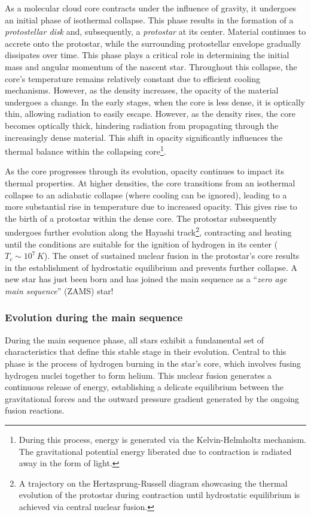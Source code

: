 \documentclass[main.tex]{subfiles}
\begin{document}
    As a molecular cloud core contracts under the influence of gravity, it undergoes an initial phase of isothermal collapse. This phase results in the formation of a \textit{protostellar disk} and, subsequently, a \textit{protostar} at its center. Material continues to accrete onto the protostar, while the surrounding protostellar envelope gradually dissipates over time. This phase plays a critical role in determining the initial mass and angular momentum of the nascent star.
    Throughout this collapse, the core's temperature remains relatively constant due to efficient cooling mechanisms. However, as the density increases, the opacity of the material undergoes a change. In the early stages, when the core is less dense, it is optically thin, allowing radiation to easily escape. However, as the density rises, the core becomes optically thick, hindering radiation from propagating through the increasingly dense material. This shift in opacity significantly influences the thermal balance within the collapsing core\footnote{During this process, energy is generated via the Kelvin-Helmholtz mechanism. The gravitational potential energy liberated due to contraction is radiated away in the form of light.}.
    
    As the core progresses through its evolution, opacity continues to impact its thermal properties. At higher densities, the core transitions from an isothermal collapse to an adiabatic collapse (where cooling can be ignored), leading to a more substantial rise in temperature due to increased opacity. This gives rise to the birth of a protostar within the dense core. The protostar subsequently undergoes further evolution along the Hayashi track\footnote{A trajectory on the Hertzsprung-Russell diagram showcasing the thermal evolution of the protostar during contraction until hydrostatic equilibrium is achieved via central nuclear fusion.}, contracting and heating until the conditions are suitable for the ignition of hydrogen in its center ($T_c \sim 10^7\,\text{}K$). The onset of sustained nuclear fusion in the protostar's core results in the establishment of hydrostatic equilibrium and prevents further collapse. A new star has just been born and has joined the main sequence as a ``\textit{zero age main sequence}'' (ZAMS) star!
    

    \subsubsection{Evolution during the main sequence}
    During the main sequence phase, all stars exhibit a fundamental set of characteristics that define this stable stage in their evolution. Central to this phase is the process of hydrogen burning in the star's core, which involves fusing hydrogen nuclei together to form helium. This nuclear fusion generates a continuous release of energy, establishing a delicate equilibrium between the gravitational forces 
    and the outward pressure gradient generated by the ongoing fusion reactions.
\end{document}
